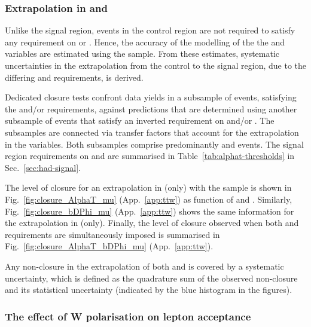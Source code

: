 \subsubsection{Extrapolation in \texorpdfstring{\alphat}{AlphaT} and
  \texorpdfstring{\bdphi}{biased dPhi}}
\label{sec:tfSyst_alphaT}

Unlike the signal region, events in the \mj control region are not
required to satisfy any requirement on \alphat or \bdphi. Hence, the
accuracy of the modelling of the the \alphat and \bdphi variables are
estimated using the \mj sample. From these estimates, systematic
uncertainties in the extrapolation from the control to the signal
region, due to the differing \alphat and \bdphi requirements, is
derived.

Dedicated closure tests confront data yields in a subsample of \mj
events, satisfying the \alphat and/or \bdphi requirements, against
predictions that are determined using another subsample of \mj events
that satisfy an inverted requirement on \alphat and/or \bdphi. The
subsamples are connected via transfer factors that account for the
extrapolation in the variables. Both subsamples comprise predominantly
\wj and \ttbar events. The signal region requirements on \alphat and
\bdphi are summarised in Table~\ref{tab:alphat-thresholds} in
Sec.~\ref{sec:had-signal}.

The level of closure for an extrapolation in \alphat (only) with the
\mj sample is shown in Fig.~\ref{fig:closure_AlphaT_mu}
(App.~\ref{app:ttw}) as function of \scalht and \njet. Similarly,
Fig.~\ref{fig:closure_bDPhi_mu} (App.~\ref{app:ttw}) shows the same
information for the extrapolation in \bdphi (only). Finally, the level
of closure observed when both \alphat and \bdphi requirements are
simultaneously imposed is summarised in
Fig.~\ref{fig:closure_AlphaT_bDPhi_mu} (App.~\ref{app:ttw}).

Any non-closure in the extrapolation of both \alphat and \bdphi is
covered by a systematic uncertainty, which is defined as the
quadrature sum of the observed non-closure and its statistical
uncertainty (indicated by the blue histogram in the figures). 


\subsubsection{The effect of W polarisation on lepton acceptance}
\label{sec:tfSyst_Wpol}

